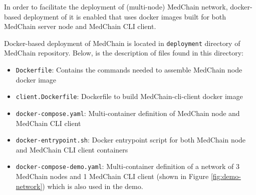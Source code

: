 
In order to facilitate the deployment of (multi-node) MedChain network, docker-based deployment of it is enabled that uses docker images built for both MedChain server node and MedChain CLI client.

Docker-based deployment of MedChain is located in \texttt{deployment} directory of MedChain repository. Below, is the description of files found in this directory:

\begin{itemize}
    \item \texttt{Dockerfile}: Contains the commands needed to assemble MedChain node docker image
    \item \texttt{client.Dockerfile}: Dockerfile to build MedChain-cli-client docker image
    \item \texttt{docker-compose.yaml}: Multi-container definition of MedChain node and MedChain CLI client
    \item \texttt{docker-entrypoint.sh}: Docker entrypoint script for both MedChain node and MedChain CLI client containers
    \item \texttt{docker-compose-demo.yaml}: Multi-container definition of a network of 3 MedChain nodes and 1 MedChain CLI client (shown in Figure \ref{fig:demo-network}) which is also used in the demo.
\end{itemize}

